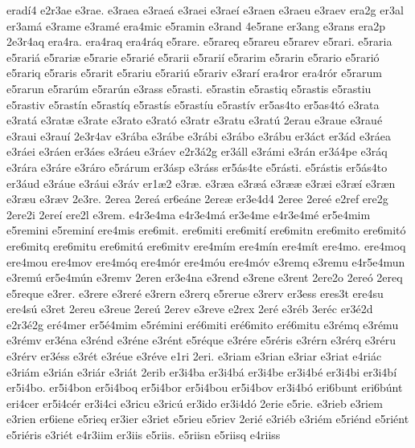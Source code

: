 {erad^^ed4
e2r3ae
e3rae.
e3raea
e3rae^^e1
e3raei
e3rae^^ed
e3raen
e3raeu
e3raev
era2g
er3al
er3am^^e1
e3rame
e3ram^^e9
era4mic
e5ramin
e3rand
4e5rane
er3ang
e3rans
era2p
2e3r4aq
era4ra.
era4raq
era4r^^e1q
e5rare.
e5rareq
e5rareu
e5rarev
e5rari.
e5raria
e5rari^^e1
e5rari^^e6
e5rarie
e5rari^^e9
e5rarii
e5rari^^ed
e5rarim
e5rarin
e5rario
e5rari^^f3
e5rariq
e5raris
e5rarit
e5rariu
e5rari^^fa
e5rariv
e3rar^^ed
era4ror
era4r^^f3r
e5rarum
e5rarun
e5rar^^fam
e5rar^^fan
e3rass
e5rasti.
e5rastin
e5rastiq
e5rastis
e5rastiu
e5rastiv
e5rast^^edn
e5rast^^edq
e5rast^^eds
e5rast^^edu
e5rast^^edv
er5as4to
er5as4t^^f3
e3rata
e3rat^^e1
e3rat^^e6
e3rate
e3rato
e3rat^^f3
e3ratr
e3ratu
e3rat^^fa
2erau
e3raue
e3rau^^e9
e3raui
e3rau^^ed
2e3r4av
e3r^^e1ba
e3r^^e1be
e3r^^e1bi
e3r^^e1bo
e3r^^e1bu
er3^^e1ct
er3^^e1d
e3r^^e1ea
e3r^^e1ei
e3r^^e1en
er3^^e1es
e3r^^e1eu
e3r^^e1ev
e2r3^^e12g
er3^^e1ll
e3r^^e1mi
e3r^^e1n
er3^^e14pe
e3r^^e1q
e3r^^e1ra
e3r^^e1re
e3r^^e1ro
e5r^^e1rum
er3^^e1sp
e3r^^e1ss
er5^^e1s4te
e5r^^e1sti.
e5r^^e1stis
er5^^e1s4to
er3^^e1ud
e3r^^e1ue
e3r^^e1ui
e3r^^e1v
er1^^e62
e3r^^e6.
e3r^^e6a
e3r^^e6^^e1
e3r^^e6^^e6
e3r^^e6i
e3r^^e6^^ed
e3r^^e6n
e3r^^e6u
e3r^^e6v
2e3re.
2erea
2ere^^e1
er6e^^e1ne
2ere^^e6
er3e4d4
2eree
2ere^^e9
e2ref
ere2g
2ere2i
2ere^^ed
ere2l
e3rem.
e4r3e4ma
e4r3e4m^^e1
er3e4me
e4r3e4m^^e9
er5e4mim
e5remini
e5remin^^ed
ere4mis
ere6mit.
ere6miti
ere6mit^^ed
ere6mitn
ere6mito
ere6mit^^f3
ere6mitq
ere6mitu
ere6mit^^fa
ere6mitv
ere4m^^edm
ere4m^^edn
ere4m^^edt
ere4mo.
ere4moq
ere4mou
ere4mov
ere4m^^f3q
ere4m^^f3r
ere4m^^f3u
ere4m^^f3v
e3remq
e3remu
e4r5e4mun
e3rem^^fa
er5e4m^^fan
e3remv
2eren
er3e4na
e3rend
e3rene
e3rent
2ere2o
2ere^^f3
2ereq
e5reque
e3rer.
e3rere
e3rer^^e9
e3rern
e3rerq
e5rerue
e3rerv
er3ess
eres3t
ere4su
ere4s^^fa
e3ret
2ereu
e3reue
2ere^^fa
2erev
e3reve
e2rex
2er^^e9
e3r^^e9b
3er^^e9c
er3^^e92d
e2r3^^e92g
er^^e94mer
er5^^e94mim
e5r^^e9mini
er^^e96miti
er^^e96mito
er^^e96mitu
e3r^^e9mq
e3r^^e9mu
e3r^^e9mv
er3^^e9na
e3r^^e9nd
e3r^^e9ne
e3r^^e9nt
e5r^^e9que
e3r^^e9re
e5r^^e9ris
e3r^^e9rn
e3r^^e9rq
e3r^^e9ru
e3r^^e9rv
er3^^e9ss
e3r^^e9t
e3r^^e9ue
e3r^^e9ve
e1ri
2eri.
e3riam
e3rian
e3riar
e3riat
e4ri^^e1c
e3ri^^e1m
e3ri^^e1n
e3ri^^e1r
e3ri^^e1t
2erib
er3i4ba
er3i4b^^e1
er3i4be
er3i4b^^e9
er3i4bi
er3i4b^^ed
er5i4bo.
er5i4bon
er5i4boq
er5i4bor
er5i4bou
er5i4bov
er3i4b^^f3
eri6bunt
eri6b^^fant
eri4cer
er5i4c^^e9r
er3i4ci
e3ricu
e3ric^^fa
er3ido
er3i4d^^f3
2erie
e5rie.
e3rieb
e3riem
e3rien
er6iene
e5rieq
er3ier
e3riet
e5rieu
e5riev
2eri^^e9
e3ri^^e9b
e3ri^^e9m
e5ri^^e9nd
e5ri^^e9nt
e5ri^^e9ris
e3ri^^e9t
e4r3iim
er3iis
e5riis.
e5riisn
e5riisq
e4riiss
}
